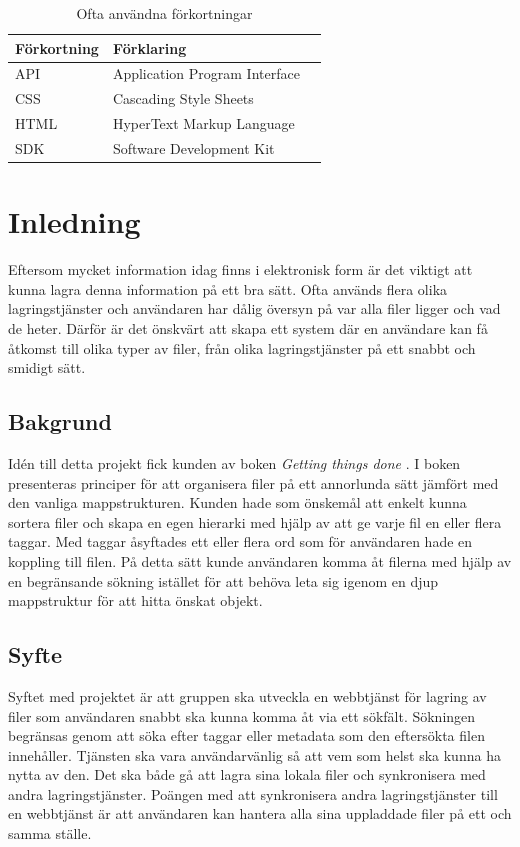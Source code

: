 \documentclass[a4paper,12pt,oneside,final]{extbook}
\begin{document}
\begin{table}[h]
  \begin{centering}
    \begin{tabular}{|l|l|l|}
    \hline
    \textbf{Förkortning} & \textbf{Förklaring} \\
    \hline
    API & Application Program Interface \\
    \hline
    CSS & Cascading Style Sheets \\
    \hline
    HTML & HyperText Markup Language \\
    \hline
    SDK & Software Development Kit \\
    \hline
    \end{tabular}
    \caption[Table caption text]{Ofta användna förkortningar}
    \label{table:abbr}
  \end{centering}
\end{table}

\mainmatter

\chapter{Inledning}
\label{ch:inledning}
Eftersom mycket information idag finns i elektronisk form är det viktigt att kunna lagra denna information på ett bra sätt. Ofta används flera olika lagringstjänster och användaren har dålig översyn på var alla filer ligger och vad de heter. Därför är det önskvärt att skapa ett system där en användare kan få åtkomst till olika typer av filer, från olika lagringstjänster på ett snabbt och smidigt sätt.

\section{Bakgrund}
Idén till detta projekt fick kunden av boken \textit{Getting things done} \cite{gettingthingsdone}. I boken presenteras principer för att organisera filer på ett annorlunda sätt jämfört med den vanliga mappstrukturen. Kunden hade som önskemål att enkelt kunna sortera filer och skapa en egen hierarki med hjälp av att ge varje fil en eller flera taggar. Med taggar åsyftades ett eller flera ord som för användaren hade en koppling till filen. På detta sätt kunde användaren komma åt filerna med hjälp av en begränsande sökning istället för att behöva leta sig igenom en djup mappstruktur för att hitta önskat objekt.

\section{Syfte}
Syftet med projektet är att gruppen ska utveckla en webbtjänst för lagring av filer som användaren snabbt ska kunna komma åt via ett sökfält. Sökningen begränsas genom att söka efter taggar eller metadata som den eftersökta filen innehåller. Tjänsten ska vara användarvänlig så att vem som helst ska kunna ha nytta av den. Det ska både gå att lagra sina lokala filer och synkronisera med andra lagringstjänster. Poängen med att synkronisera andra lagringstjänster till en webbtjänst är att användaren kan hantera alla sina uppladdade filer på ett och samma ställe.
\end{document}
